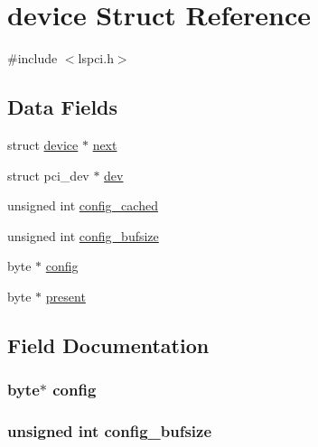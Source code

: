 \hypertarget{structdevice}{}\section{device Struct Reference}
\label{structdevice}


{\ttfamily \#include $<$lspci.\+h$>$}

\subsection*{Data Fields}
\begin{DoxyCompactItemize}
\item 
struct \hyperlink{structdevice}{device} $\ast$ \hyperlink{structdevice_a37f558b4fc81c233fc9745ffa9fdf856}{next}
\item 
struct pci\+\_\+dev $\ast$ \hyperlink{structdevice_aeb91c60cf706205b37cdd63dc6040761}{dev}
\item 
unsigned int \hyperlink{structdevice_a438fad4585f575efbcd5bc2ace1350d4}{config\+\_\+cached}
\item 
unsigned int \hyperlink{structdevice_a0da316df4dbcb29cb7d1a7676552a925}{config\+\_\+bufsize}
\item 
byte $\ast$ \hyperlink{structdevice_a024b921277724de64d95e678a9ec4e74}{config}
\item 
byte $\ast$ \hyperlink{structdevice_ad3675b50c8eb9d8b46ae2ca476f2b803}{present}
\end{DoxyCompactItemize}


\subsection{Field Documentation}
\subsubsection[{\texorpdfstring{config}{config}}]{\setlength{\rightskip}{0pt plus 5cm}byte$\ast$ config}\hypertarget{structdevice_a024b921277724de64d95e678a9ec4e74}{}\label{structdevice_a024b921277724de64d95e678a9ec4e74}
\subsubsection[{\texorpdfstring{config\+\_\+bufsize}{config_bufsize}}]{\setlength{\rightskip}{0pt plus 5cm}unsigned int config\+\_\+bufsize}\hypertarget{structdevice_a0da316df4dbcb29cb7d1a7676552a925}{}\label{structdevice_a0da316df4dbcb29cb7d1a7676552a925}
